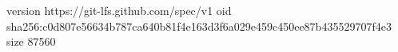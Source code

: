 version https://git-lfs.github.com/spec/v1
oid sha256:c0d807e56634b787ca640b81f4e163d3f6a029e459c450ee87b435529707f4e3
size 87560
